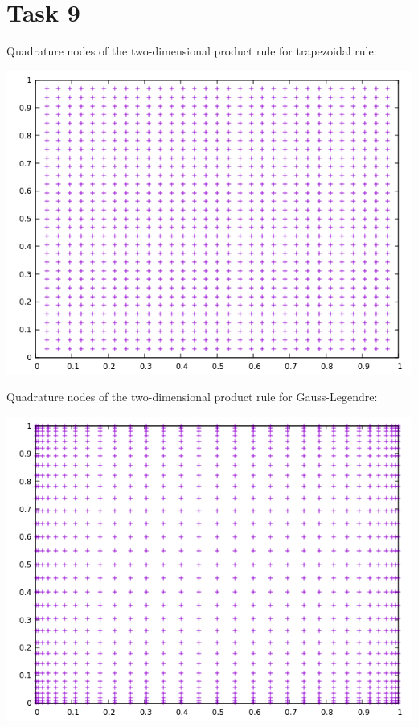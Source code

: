 \documentclass[10pt,a4paper]{article}
\begin{document}
\section*{Task 9}

Quadrature nodes of the two-dimensional product rule for trapezoidal rule:
\begin{center}
\includegraphics[scale=0.5]{quadrature_nodes_trapezoidal_rule.png}		
\end{center}

Quadrature nodes of the two-dimensional product rule for Gauss-Legendre:
\begin{center}
\includegraphics[scale=0.5]{quadrature_nodes_gauss_legendre.png}		
\end{center}
\end{document}
